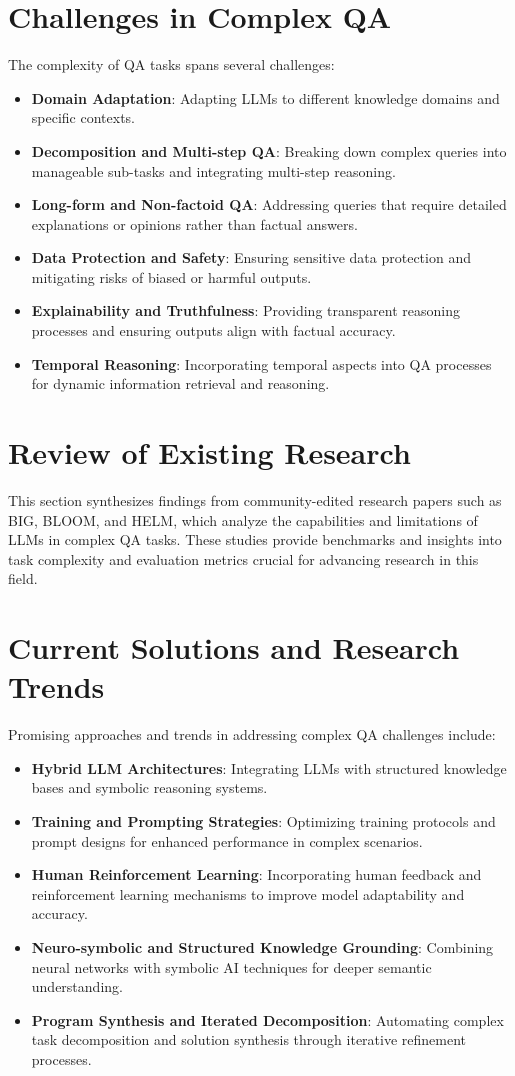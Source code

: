\documentclass{article}
\begin{document}
\section{Challenges in Complex QA}
The complexity of QA tasks spans several challenges:
\begin{itemize}
    \item \textbf{Domain Adaptation}: Adapting LLMs to different knowledge domains and specific contexts.
    \item \textbf{Decomposition and Multi-step QA}: Breaking down complex queries into manageable sub-tasks and integrating multi-step reasoning.
    \item \textbf{Long-form and Non-factoid QA}: Addressing queries that require detailed explanations or opinions rather than factual answers.
    \item \textbf{Data Protection and Safety}: Ensuring sensitive data protection and mitigating risks of biased or harmful outputs.
    \item \textbf{Explainability and Truthfulness}: Providing transparent reasoning processes and ensuring outputs align with factual accuracy.
    \item \textbf{Temporal Reasoning}: Incorporating temporal aspects into QA processes for dynamic information retrieval and reasoning.
\end{itemize}

\section{Review of Existing Research}
This section synthesizes findings from community-edited research papers such as BIG, BLOOM, and HELM, which analyze the capabilities and limitations of LLMs in complex QA tasks. These studies provide benchmarks and insights into task complexity and evaluation metrics crucial for advancing research in this field.

\section{Current Solutions and Research Trends}
Promising approaches and trends in addressing complex QA challenges include:
\begin{itemize}
    \item \textbf{Hybrid LLM Architectures}: Integrating LLMs with structured knowledge bases and symbolic reasoning systems.
    \item \textbf{Training and Prompting Strategies}: Optimizing training protocols and prompt designs for enhanced performance in complex scenarios.
    \item \textbf{Human Reinforcement Learning}: Incorporating human feedback and reinforcement learning mechanisms to improve model adaptability and accuracy.
    \item \textbf{Neuro-symbolic and Structured Knowledge Grounding}: Combining neural networks with symbolic AI techniques for deeper semantic understanding.
    \item \textbf{Program Synthesis and Iterated Decomposition}: Automating complex task decomposition and solution synthesis through iterative refinement processes.
\end{itemize}
\end{document}
